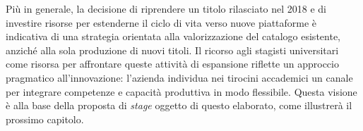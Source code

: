 Più in generale, la decisione di riprendere un titolo rilasciato nel 2018 e di investire risorse per estenderne il ciclo di vita verso nuove piattaforme è indicativa di una strategia orientata alla valorizzazione del catalogo esistente, anziché alla sola produzione di nuovi titoli. Il ricorso agli stagisti universitari come risorsa per affrontare queste attività di espansione riflette un approccio pragmatico all'innovazione: l'azienda individua nei tirocini accademici un canale per integrare competenze e capacità produttiva in modo flessibile. Questa visione è alla base della proposta di \textit{stage} oggetto di questo elaborato, come illustrerà il prossimo capitolo.